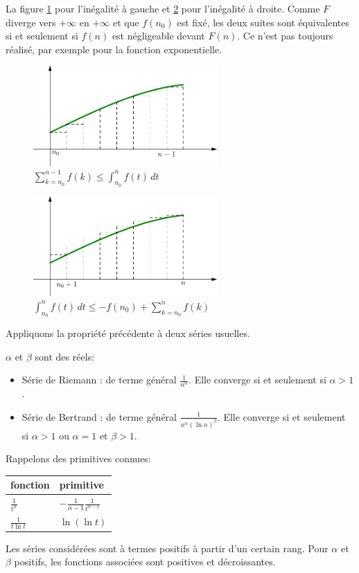 La figure \ref{fig:C9650_3} pour l'inégalité à gauche et \ref{fig:C9650_4} pour l'inégalité à droite. Comme $F$ diverge vers $+\infty$ en $+\infty$ et que $f(n_0)$ est fixé, les deux suites sont équivalentes si et seulement si $f(n)$ est négligeable devant $F(n)$.\newline
Ce n'est pas toujours réalisé, par exemple pour la fonction exponentielle.
\begin{figure}[ht]
    \centering
    \includegraphics[width=7cm]{./C9650_3.pdf}
    \caption{$\sum_{k=n_0}^{n-1}f(k) \leq \int_{n_0}^nf(t)\,dt$}
    \label{fig:C9650_3}
\end{figure}
\begin{figure}[ht]
    \centering
    \includegraphics[width=7cm]{./C9650_4.pdf}
    \caption{$\int_{n_0}^nf(t)\,dt \leq -f(n_0)+\sum_{k=n_0}^{n}f(k)$}
    \label{fig:C9650_4}
\end{figure}
\clearpage
Appliquons la propriété précédente à deux séries usuelles.
\begin{prop}
$\alpha$ et $\beta$ sont des réels:
\begin{itemize}
  \item Série de Riemann : de terme général $\frac{1}{n^\alpha}$. Elle converge si et seulement si $\alpha >1$.
  \item Série de Bertrand : de terme général $\frac{1}{n^\alpha(\ln n)^\beta}$. Elle converge si et seulement si $\alpha >1$ ou $\alpha = 1$ et $\beta>1$.
\end{itemize}  
\end{prop}
\begin{demo}
  Rappelons des primitives connues:
\begin{center}
\renewcommand{\arraystretch}{1.6}
\begin{tabular}{|l|l|} \hline
fonction & primitive \\ \hline
$\frac{1}{t^\alpha}$ & $-\frac{1}{\alpha -1}\frac{1}{t^{\alpha -1}}$ \\ \hline
$\frac{1}{t\ln t}$ & $\ln(\ln t)$ \\\hline
\end{tabular}
\end{center}
Les séries considérées sont à termes positifs à partir d'un certain rang. Pour $\alpha$ et $\beta$ positifs, les fonctions associées sont positives et décroissantes.
\end{demo}

